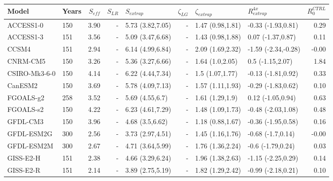 \documentclass[esd, article]{copernicus}
\begin{document}
\clearpage
\begin{table}[t]
\small
\begin{tabular}{llrrlrllr}
\toprule
       Model & Years &  $S_{eff}$ &  $S_{LR}$ &       $S_{extrap}$ & $\zeta_{LG}$ &   $\zeta_{extrap}$ &    $R^{4x}_{extrap}$ & $R^{CTRL}_0$ \\
\midrule
     ACCESS1-0 &   150 &       3.90 &         - &  5.73 (3.82,7.05) &       - &  1.47 (0.98,1.81) &   -0.33 (-1.93,0.81) &         0.29 \\
     ACCESS1-3 &   151 &       3.56 &         - &  5.09 (3.47,6.68) &       - &  1.43 (0.98,1.88) &    0.07 (-1.37,0.87) &         0.11 \\
         CCSM4 &   151 &       2.94 &         - &  6.14 (4.99,6.84) &       - &  2.09 (1.69,2.32) &  -1.59 (-2.34,-0.28) &        -0.00 \\
      CNRM-CM5 &   150 &       3.26 &         - &  5.36 (3.27,6.66) &       - &   1.64 (1.0,2.05) &     0.5 (-1.15,2.07) &         1.84 \\
 CSIRO-Mk3-6-0 &   150 &       4.14 &         - &  6.22 (4.44,7.34) &       - &   1.5 (1.07,1.77) &   -0.13 (-1.81,0.92) &         0.33 \\
       CanESM2 &   150 &       3.69 &         - &  5.78 (4.09,7.13) &       - &  1.57 (1.11,1.93) &   -0.29 (-1.83,0.62) &         0.10 \\
     FGOALS-g2 &   258 &       3.52 &         - &   5.69 (4.55,6.7) &       - &   1.61 (1.29,1.9) &    0.12 (-1.05,0.94) &         0.63 \\
     FGOALS-s2 &   150 &       4.22 &         - &  6.23 (4.61,7.29) &       - &  1.48 (1.09,1.73) &   -0.48 (-2.03,1.08) &         0.48 \\
      GFDL-CM3 &   150 &       3.96 &         - &   4.68 (3.5,6.62) &       - &  1.18 (0.88,1.67) &   -0.36 (-1.95,0.58) &         0.16 \\
    GFDL-ESM2G &   300 &       2.56 &         - &  3.73 (2.97,4.51) &       - &  1.45 (1.16,1.76) &    -0.68 (-1.7,0.14) &        -0.00 \\
    GFDL-ESM2M &   300 &       2.67 &         - &  4.71 (3.64,5.99) &       - &  1.76 (1.36,2.24) &    -0.6 (-1.79,0.24) &         0.03 \\
     GISS-E2-H &   151 &       2.38 &         - &  4.66 (3.29,6.24) &       - &  1.96 (1.38,2.63) &   -1.15 (-2.25,0.29) &         0.14 \\
     GISS-E2-R &   151 &       2.14 &         - &  3.89 (2.75,5.19) &       - &  1.82 (1.29,2.42) &   -0.99 (-2.18,0.21) &         0.10 \\

\end{tabular}
\end{table}
\end{document}
